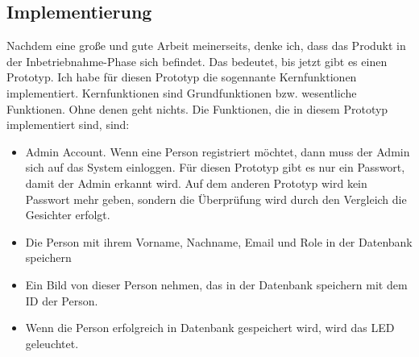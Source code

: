 \subsection{Implementierung}
Nachdem eine große und gute Arbeit meinerseits, denke ich, dass das Produkt in der Inbetriebnahme-Phase sich befindet. Das bedeutet, bis jetzt gibt es einen Prototyp. Ich habe für diesen Prototyp die sogennante Kernfunktionen implementiert. Kernfunktionen sind Grundfunktionen bzw. wesentliche Funktionen. Ohne denen geht nichts. Die Funktionen, die in diesem Prototyp implementiert sind, sind:
\begin{itemize}
	\item Admin Account. Wenn eine Person registriert möchtet, dann muss der Admin sich auf das System einloggen. Für diesen Prototyp gibt es nur ein Passwort, damit der Admin erkannt wird. Auf dem anderen Prototyp wird kein Passwort mehr geben, sondern die Überprüfung wird durch den Vergleich die Gesichter erfolgt.
	\item Die Person mit ihrem Vorname, Nachname, Email und Role in der Datenbank speichern
	\item Ein Bild von dieser Person nehmen, das in der Datenbank speichern mit dem ID der Person.
	\item Wenn die Person erfolgreich in Datenbank gespeichert wird, wird das LED geleuchtet.
\end{itemize}
